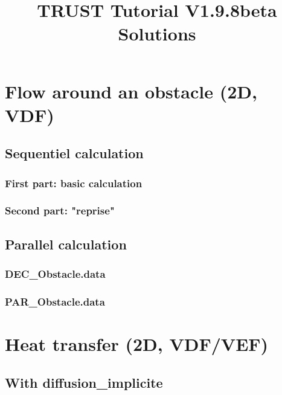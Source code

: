 \documentclass[english]{article}
\begin{document}
\title{TRUST Tutorial V1.9.8beta Solutions}
\maketitle
\tableofcontents{}
\newpage

\section{Flow around an obstacle (2D, VDF)}
\subsection{Sequentiel calculation}
\subsubsection{First part: basic calculation}

\subsubsection{Second part: "reprise"}


\subsection{Parallel calculation}
\subsubsection{DEC\_Obstacle.data}

\subsubsection{PAR\_Obstacle.data}



\section{Heat transfer (2D, VDF/VEF)}
\subsection{With diffusion\_implicite}

\end{document}
